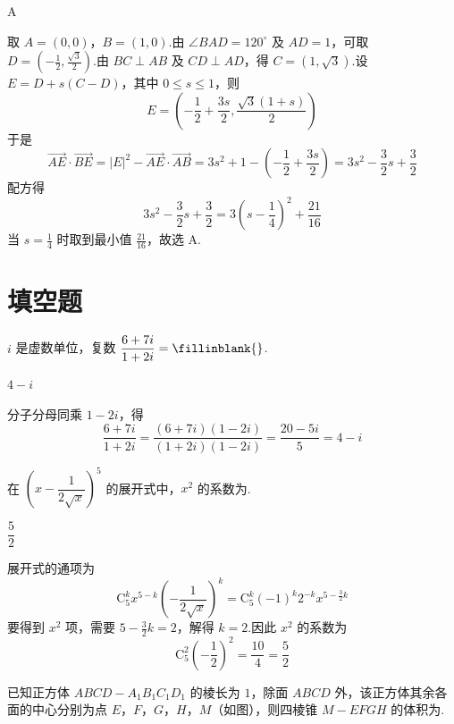 \begin{answer}
A
\end{answer}

\begin{solution}
取 \(A=(0,0)\)，\(B=(1,0)\).由 \(\angle BAD=120^\circ\) 及 \(AD=1\)，可取 \(D=(-\frac12,\frac{\sqrt3}{2})\).由 \(BC\perp AB\) 及 \(CD\perp AD\)，得 \(C=(1,\sqrt3)\).设 \(E=D+s(C-D)\)，其中 \(0\le s\le1\)，则
\[
E=\left(-\frac12+\frac{3s}{2},\frac{\sqrt3(1+s)}2\right)
\]
于是
\[
\overrightarrow{AE}\cdot\overrightarrow{BE}
=|E|^2-\overrightarrow{AE}\cdot\overrightarrow{AB}
=3s^2+1-\left(-\frac12+\frac{3s}{2}\right)
=3s^2-\frac32s+\frac32
\]
配方得
\[
3s^2-\frac32s+\frac32=3\left(s-\frac14\right)^2+\frac{21}{16}
\]
当 \(s=\frac14\) 时取到最小值 \(\frac{21}{16}\)，故选 A.
\end{solution}

\section{填空题}

\begin{problem}
\(i\) 是虚数单位，复数 \(\dfrac{6+7i}{1+2i}=\fillinblank{}\).
\end{problem}

\begin{answer}
\(4-i\)
\end{answer}

\begin{solution}
分子分母同乘 \(1-2i\)，得
\[
\frac{6+7i}{1+2i}
=\frac{(6+7i)(1-2i)}{(1+2i)(1-2i)}
=\frac{20-5i}{5}
=4-i
\]
\end{solution}

\begin{problem}
在 \(\left(x-\dfrac1{2\sqrt{x}}\right)^5\) 的展开式中，\(x^2\) 的系数为\fillinblank{}.
\end{problem}

\begin{answer}
\(\dfrac52\)
\end{answer}

\begin{solution}
展开式的通项为
\[
\mathrm C_5^k x^{5-k}\left(-\frac1{2\sqrt{x}}\right)^k
=\mathrm C_5^k(-1)^k2^{-k}x^{5-\frac32k}
\]
要得到 \(x^2\) 项，需要 \(5-\frac32k=2\)，解得 \(k=2\).因此 \(x^2\) 的系数为
\[
\mathrm C_5^2\left(-\frac12\right)^2=\frac{10}{4}=\frac52
\]
\end{solution}

\begin{problem}
已知正方体 \(ABCD-A_1B_1C_1D_1\) 的棱长为 \(1\)，除面 \(ABCD\) 外，该正方体其余各面的中心分别为点 \(E\)，\(F\)，\(G\)，\(H\)，\(M\)（如图），则四棱锥 \(M-EFGH\) 的体积为\fillinblank{}.

\end{problem}

